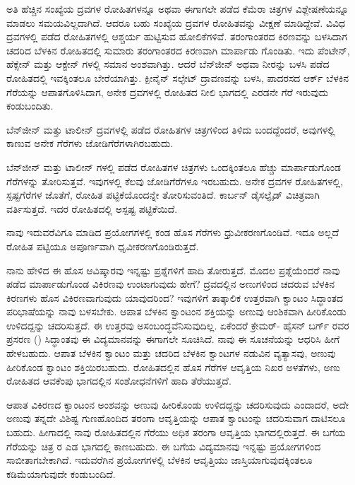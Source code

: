 ಅತಿ ಹೆಚ್ಚಿನ ಸಂಖ್ಯೆಯ ದ್ರವಗಳ ರೋಹಿತಗಳನ್ನೂ ಅಥವಾ ಈಗಾಗಲೇ ಪಡೆದ ಕೆಮೆರಾ ಚಿತ್ರಗಳ ವಿಶ್ಲೇಷಣೆಯನ್ನೂ ಮಾಡಲು ಸಮಯವಿಲ್ಲದಾಗಿದೆ. ಆದರೂ ಬಹು ಸಂಖ್ಯೆಯ ದ್ರವಗಳ ರೋಹಿತವನ್ನು ವೀಕ್ಷಣೆ ಮಾಡಿದ್ದೇವೆ. ವಿವಿಧ ದ್ರವಗಳಲ್ಲಿ ಪಡೆದ ರೋಹಿತಗಳಲ್ಲಿ ಆಶ್ಚರ್ಯ ಹುಟ್ಟಿಸುವ ಹೋಲಿಕೆಗಳಿವೆ.  ತರಂಗಾಂತರದ ಕಿರಣವನ್ನು ಬಳಸಿದಾಗ ಚದರಿದ ಬೆಳಕಿನ ರೋಹಿತದಲ್ಲಿ ಸುಮಾರು  ತರಂಗಾಂತರದ ಕಿರಣವಾಗಿ ಮಾರ್ಪಾಡು ಗೊಂಡಿತು. ಇದು ಪೆಂಟೇನ್, ಹೆಕ್ಸೇನ್ ಮತ್ತು ಆಕ್ಟೇನ್ ಗಳಲ್ಲಿ ಸಮಾನ ಅಂಶವಾಗಿತ್ತು. ಆದರೆ ಬೆನ್‍ಜೀನ್ ಅಥವಾ ನೀರನ್ನು ಬಳಸಿ ಪಡೆದ ರೋಹಿತದಲ್ಲಿ ಇವಕ್ಕಿಂತಲೂ ಬೇರೆಯಾಗಿತ್ತು. ಕ್ಪೀನೈನ್ ಸಲ್ಫೇಟ್ ದ್ರಾವಣವನ್ನು ಬಳಸಿ, ಪಾದರಸದ ಆರ್ಕ್ ಬೆಳಕಿನ  ಗೆರೆಯನ್ನು ಆಪಾತಗೊಳಿಸಿದಾಗ, ಅನೇಕ ದ್ರವಗಳಲ್ಲಿ ರೋಹಿತದ ನೀಲಿ ಭಾಗದಲ್ಲಿ ಎರಡನೇ ಗೆರೆ ಇರುವುದು ಕಂಡುಬಂದಿತು.

ಬೆನ್‍ಜೀನ್ ಮತ್ತು ಟಾಲೀನ್ ದ್ರವಗಳಲ್ಲಿ ಪಡೆದ ರೋಹಿತಗಳ ಚಿತ್ರಗಳಿಂದ ತಿಳಿದು ಬಂದದ್ದೆಂದರೆ, ಅವುಗಳಲ್ಲಿ ಕಾಣುವ ಅನೇಕ ಗೆರೆಗಳು ಜೋಡಿಗೆರೆಗಳಾಗಿರಬಹುದು.

ಬೆನ್‍ಜೀನ್ ಮತ್ತು ಟಾಲೀನ್ ಗಳಲ್ಲಿ ಪಡೆದ ರೋಹಿತಗಳ ಚಿತ್ರಗಳು ಒಂದಕ್ಕಿಂತಲೂ ಹೆಚ್ಚು ಮಾರ್ಪಾಡುಗೊಂಡ ಗೆರೆಗಳನ್ನು ತೋರಿಸುತ್ತವೆ. ಇವುಗಳಲ್ಲಿ ಕೆಲವು ಜೋಡಿಗೆರೆಗಳೂ ಇರಬಹುದು. ಅನೇಕ ದ್ರವಗಳ ರೋಹಿತಗಳಲ್ಲಿ, ಸ್ಪಷ್ಟಗೆರೆಗಳ ಜೊತೆಗೆ, ರೋಹಿತ ಪಟ್ಟಿಕೆಯೊಂದನ್ನೇ ತೋರಿಸುವಂತಿದೆ. ಕಾರ್ಬನ್ ಡೈಸಲ್ಫೈಡ್ ವಿಚಿತ್ರವಾಗಿ ವರ್ತಿಸುತ್ತದೆ. ಇದರ ರೋಹಿತದಲ್ಲಿ ಅಸ್ಪಷ್ಟ ಪಟ್ಟಿಕೆಯಿದೆ.

ನಾವು ಇದುವರೆವಿಗೂ ಮಾಡಿದ ಪ್ರಯೋಗಗಳಲ್ಲಿ ಕಂಡ ಹೊಸ ಗೆರೆಗಳು ಧ್ರುವೀಕರಣಗೊಂಡಿವೆ. ಇದೂ ಅಲ್ಲದೆ ರೋಹಿತ ಪಟ್ಟಿಯೂ ಅಪೂರ್ಣವಾಗಿ ಧೃವೀಕರಣಗೊಂಡಿರುತ್ತದೆ.



ನಾನು ಹೇಳಿದ ಈ ಹೊಸ ಆವಿಷ್ಕಾರವು ಇನ್ನಷ್ಟು ಪ್ರಶ್ನೆಗಳಿಗೆ ಹಾದಿ ತೋರುತ್ತದೆ. ಮೊದಲ ಪ್ರಶ್ನೆಯೆಂದರೆ ನಾವು ಪಡೆದ ಮಾರ್ಪಾಡುಗೊಂಡ ವಿಕಿರಣವು ಉಂಟಾಗುವುದು ಹೇಗೆ? ದ್ರವದಲ್ಲಿನ ಅಣುಗಳಿಂದ ಚದರುವ ಬೆಳಕಿನ ಕಿರಣಗಳು ಹೊಸ ವಿಕಿರಣವಾಗುವುದು ಯಾವುದರಿಂದ? ಇವುಗಳಿಗೆ ತಾತ್ಕಾಲಿಕ ಉತ್ತರವಾಗಿ ಕ್ವಾಂಟಂ ಸಿದ್ಧಾಂತದ ಪರಿಭಾಷೆಯನ್ನು ನಾವು ಬಳಸಬೇಕು. ಆಪಾತ ಬೆಳಕಿನ ಕ್ವಾಂಟಂನ ಶಕ್ತಿಯನ್ನು ಅಣುವು ಆಂಶಿಕವಾಗಿ ಹೀರಿಕೊಂಡು ಉಳಿದದ್ದನ್ನು ಚದರಿಸುತ್ತದೆ. ಈ ಉತ್ತರವು ಅಸಂಬಂದ್ಧವೆನಿಸುವುದಿಲ್ಲ. ಏಕೆಂದರೆ ಕ್ರೇಮರ್- ಹೈಸನ್ ಬರ್ಗ್ ರವರ ಪ್ರಸರಣ () ಸಿದ್ಧಾಂತವು ಈ ವಿದ್ಯಮಾನವನ್ನು ಈಗಾಗಲೇ ಸೂಚಿಸಿದೆ. ನಾವು ಈ ಸೂಚನೆಯನ್ನು ಆಧರಿಸಿ ಹೀಗೆ ಹೇಳಬಹುದು. ಆಪಾತ ಬೆಳಕಿನ ಕ್ವಾಂಟಂ ಮತ್ತು ಚದರಿದ ಬೆಳಕಿನ ಕ್ವಾಂಟಗಳ ನಡುವಿನ ವ್ಯತ್ಯಾಸವು, ಅಣುವು ಹೀರಿಕೊಂಡ ಕ್ವಾಂಟಂ ಶಕ್ತಿಯಿರಬಹುದು. ರೋಹಿತದಲ್ಲಿನ ಹೊಸ ಗೆರೆಗಳ ಆವೃತ್ತಿಯ ನಿಖರ ಅಳತೆಗಳು, ಅಣು ರೋಹಿತದ ಆವಕೆಂಪು ಭಾಗದಲ್ಲಿನ ಸಂಶೋಧನೆಗಳಿಗೆ ಹಾದಿ ತೆರೆಯುತ್ತದೆ.

ಆಪಾತ ವಿಕಿರಣದ ಕ್ವಾಂಟಂನ ಅಂಶವನ್ನು ಅಣುವು ಹೀರಿಕೊಂಡು ಉಳಿದದ್ದನ್ನು ಚದರಿಸುವುದು ಎಂದಾದರೆ, ಅದೇ ಅಣುವು ತನ್ನದೇ ವಿಶಿಷ್ಟ ಗುಣಹೊಂದಿದ ತರಂಗಾ ಆವೃತ್ತಿಯನ್ನು ಆಪಾತ ಕ್ವಾಂಟಂನ್ನು ಚದರಿಸುವಾಗ ದಾಟಿಸಲೂ ಬಹುದು. ಹೀಗಾದಲ್ಲಿ ನಾವು ರೋಹಿತದಲ್ಲಿನ ಗೆರೆಯು ಅಧಿಕ ತರಂಗಾ ಆವೃತ್ತಿಯ ಭಾಗದಲ್ಲಿರುತ್ತದೆ. ಈ ಬಗೆಯ ಗೆರೆಯನ್ನು ಚಿತ್ರ  ರ ಎಡ ಭಾಗದಲ್ಲಿ ಕಾಣಬಹುದು. ಈ ಬಗೆಯ ವಿದ್ಯಮಾನವು ಇನ್ನಷ್ಟು ಪ್ರಯೋಗಗಳಿಂದ ಸಾಬೀತಾಗಬೇಕಾಗಿದೆ. ಇದುವರೆಗಿನ ಪ್ರಯೋಗಗಳಲ್ಲಿ ಬೆಳಕಿನ ಆವೃತ್ತಿಯು ಜಾಸ್ತಿಯಾಗುವುದಕ್ಕಿಂತಲೂ ಕಡಿಮೆಯಾಗುವುದೇ ಕಂಡುಬಂದಿದೆ.

